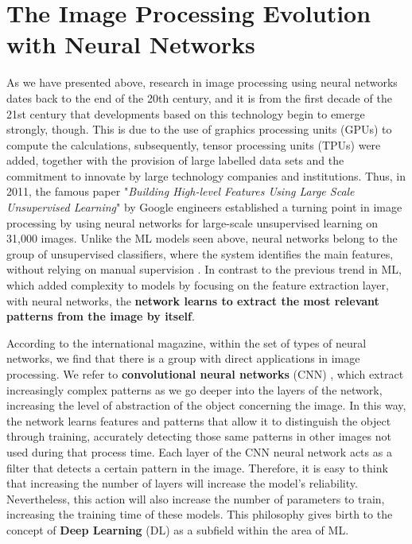 \section{The Image Processing Evolution with Neural Networks}

As we have presented above, research in image processing using neural networks dates back to the end of the 20th century, and it is from the first decade of the 21st century that developments based on this technology begin to emerge strongly, though. This is due to the use of graphics processing units (GPUs) to compute the calculations, subsequently, tensor processing units (TPUs) were added, together with the provision of large labelled data sets and the commitment to innovate by large technology companies and institutions. Thus, in 2011, the famous paper "\textit{Building High-level Features Using Large Scale Unsupervised Learning}" \cite{le_building_2012} by Google engineers established a turning point in image processing by using neural networks for large-scale unsupervised learning on 31,000 images. Unlike the ML models seen above, neural networks belong to the group of unsupervised classifiers, where the system identifies the main features, without relying on manual supervision \cite{le_building_2012}. In contrast to the previous trend in ML, which added complexity to models by focusing on the feature extraction layer, with neural networks, the\textbf{ network learns to extract the most relevant patterns from the image by itself}.

According to the international magazine, within the set of types of neural networks, we find that there is a group with direct applications in image processing. We refer to \textbf{convolutional neural networks} (CNN) \cite{shiri_comprehensive_nodate} \cite{chen_review_2021}, which extract increasingly complex patterns as we go deeper into the layers of the network, increasing the level of abstraction of the object concerning the image. In this way, the network learns features and patterns that allow it to distinguish the object through training, accurately detecting those same patterns in other images not used during that process time. Each layer of the CNN neural network acts as a filter that detects a certain pattern in the image. Therefore, it is easy to think that increasing the number of layers will increase the model's reliability. Nevertheless, this action will also increase the number of parameters to train, increasing the training time of these models. This philosophy gives birth to the concept of \textbf{Deep Learning }(DL) \cite{noauthor_what_nodate} as a subfield within the area of ML.

